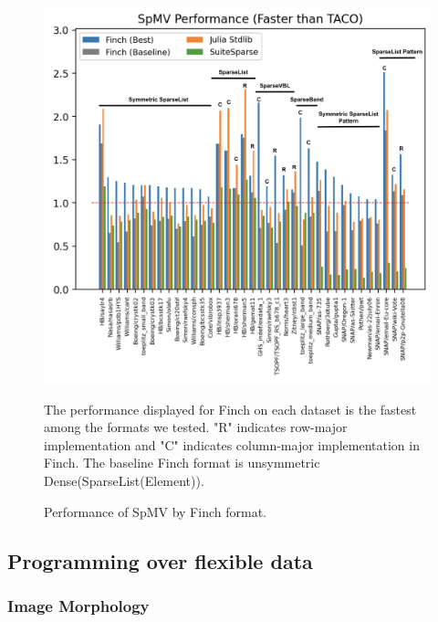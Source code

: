 \begin{figure}
    \includegraphics[width=\linewidth]{spmv_performance_grouped.png}
    \caption{Performance of SpMV by Finch format.}
    \label{spmv_grouped}
    \footnotesize The performance displayed for Finch on each dataset is the fastest among the formats we tested. "R" indicates row-major implementation and "C" indicates column-major implementation in Finch. The baseline Finch format is unsymmetric Dense(SparseList(Element)).
\end{figure}

\subsection{Programming over flexible data}

\subsubsection{Image Morphology}



